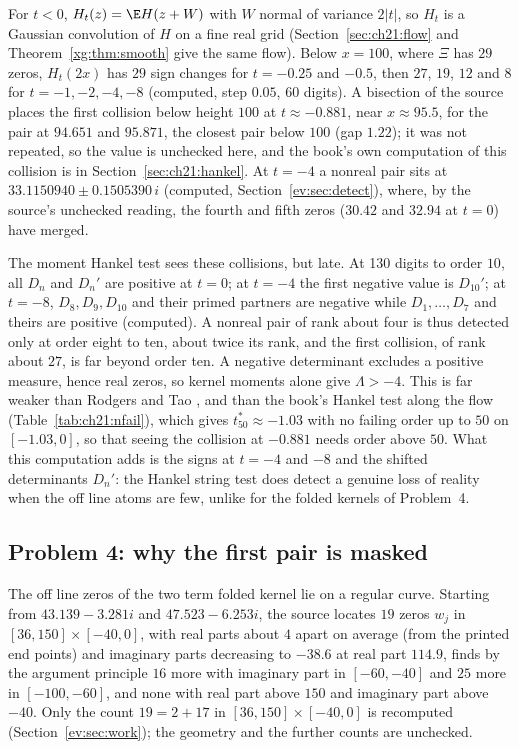 For $t<0$, $H_t(z)=\E H(z+W)$ with $W$ normal of variance $2|t|$, so $H_t$ is a Gaussian convolution of $H$ on a fine real grid (Section~\ref{sec:ch21:flow} and Theorem~\ref{xg:thm:smooth} give the same flow). Below $x=100$, where $\Xi$ has $29$ zeros, $H_t(2x)$ has $29$ sign changes for $t=-0.25$ and $-0.5$, then $27$, $19$, $12$ and $8$ for $t=-1,-2,-4,-8$ (computed, step $0.05$, $60$ digits). A bisection of the source places the first collision below height $100$ at $t\approx-0.881$, near $x\approx95.5$, for the pair at $94.651$ and $95.871$, the closest pair below $100$ (gap $1.22$); it was not repeated, so the value is unchecked here, and the book's own computation of this collision is in Section~\ref{sec:ch21:hankel}. At $t=-4$ a nonreal pair sits at $33.1150940\pm0.1505390\,i$ (computed, Section~\ref{ev:sec:detect}), where, by the source's unchecked reading, the fourth and fifth zeros ($30.42$ and $32.94$ at $t=0$) have merged.

The moment Hankel test sees these collisions, but late. At 130 digits to order $10$, all $D_n$ and $D_n'$ are positive at $t=0$; at $t=-4$ the first negative value is $D_{10}'$; at $t=-8$, $D_8,D_9,D_{10}$ and their primed partners are negative while $D_1,\ldots,D_7$ and theirs are positive (computed). A nonreal pair of rank about four is thus detected only at order eight to ten, about twice its rank, and the first collision, of rank about $27$, is far beyond order ten. A negative determinant excludes a positive measure, hence real zeros, so kernel moments alone give $\Lambda>-4$. This is far weaker than Rodgers and Tao \cite{RodgersTao}, and than the book's Hankel test along the flow (Table~\ref{tab:ch21:nfail}), which gives $t^*_{50}\approx-1.03$ with no failing order up to $50$ on $[-1.03,0]$, so that seeing the collision at $-0.881$ needs order above $50$. What this computation adds is the signs at $t=-4$ and $-8$ and the shifted determinants $D_n'$: the Hankel string test does detect a genuine loss of reality when the off line atoms are few, unlike for the folded kernels of Problem~4.

\subsection{Problem 4: why the first pair is masked}

The off line zeros of the two term folded kernel lie on a regular curve. Starting from $43.139-3.281i$ and $47.523-6.253i$, the source locates $19$ zeros $w_j$ in $[36,150]\times[-40,0]$, with real parts about $4$ apart on average (from the printed end points) and imaginary parts decreasing to $-38.6$ at real part $114.9$, finds by the argument principle $16$ more with imaginary part in $[-60,-40]$ and $25$ more in $[-100,-60]$, and none with real part above $150$ and imaginary part above $-40$. Only the count $19=2+17$ in $[36,150]\times[-40,0]$ is recomputed (Section~\ref{ev:sec:work}); the geometry and the further counts are unchecked.

